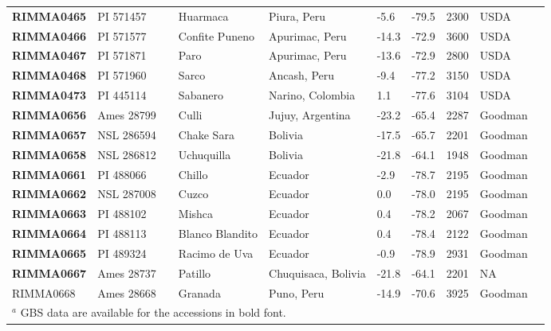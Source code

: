\begin{table}[h]
\begin{center}
{\begin{tabular}{llllllllll}
{\bf RIMMA0465}	&	PI 571457	&		&	Huarmaca	&	Piura, Peru	&	-5.6 	&	-79.5 	&	2300	&	USDA	\\
{\bf RIMMA0466}	&	PI 571577	&		&	Confite Puneno	&	Apurimac, Peru	&	-14.3 	&	-72.9 	&	3600	&	USDA	\\
{\bf RIMMA0467}	&	PI 571871	&		&	Paro	&	Apurimac, Peru	&	-13.6 	&	-72.9 	&	2800	&	USDA	\\
{\bf RIMMA0468}	&	PI 571960	&		&	Sarco	&	Ancash, Peru	&	-9.4 	&	-77.2 	&	3150	&	USDA	\\
{\bf RIMMA0473}	&	PI 445114	&		&	Sabanero	&	Narino, Colombia	&	1.1 	&	-77.6 	&	3104	&	USDA	\\
{\bf RIMMA0656}	&	Ames 28799	&		&	Culli	&	Jujuy, Argentina	&	-23.2 	&	-65.4 	&	2287	&	Goodman	\\
{\bf RIMMA0657}	&	NSL 286594	&		&	Chake Sara	&	Bolivia	&	-17.5 	&	-65.7 	&	2201	&	Goodman	\\
{\bf RIMMA0658}	&	NSL 286812	&		&	Uchuquilla	&	Bolivia	&	-21.8 	&	-64.1 	&	1948	&	Goodman	\\
{\bf RIMMA0661}	&	PI 488066	&		&	Chillo	&	Ecuador	&	-2.9 	&	-78.7 	&	2195	&	Goodman	\\
{\bf RIMMA0662}	&	NSL 287008	&		&	Cuzco	&	Ecuador	&	0.0 	&	-78.0 	&	2195	&	Goodman	\\
{\bf RIMMA0663}	&	PI 488102	&		&	Mishca	&	Ecuador	&	0.4 	&	-78.2 	&	2067	&	Goodman	\\
{\bf RIMMA0664}	&	PI 488113	&		&	Blanco Blandito	&	Ecuador	&	0.4 	&	-78.4 	&	2122	&	Goodman	\\
{\bf RIMMA0665}	&	PI 489324	&		&	Racimo de Uva	&	Ecuador	&	-0.9 	&	-78.9 	&	2931	&	Goodman	\\
{\bf RIMMA0667}	&	Ames 28737	&		&	Patillo	&	Chuquisaca, Bolivia	&	-21.8 	&	-64.1 	&	2201	&	NA	\\
RIMMA0668	&	Ames 28668	&		&	Granada	&	Puno, Peru	&	-14.9 	&	-70.6 	&	3925	&	Goodman	\\[-0.1mm] 
	\hline\hline
	\multicolumn{9}{l}{$^a$ GBS data are available for the accessions in bold font.}\\
    \end{tabular}}
    \label{srkid}

\end{center} 

\end{table}

